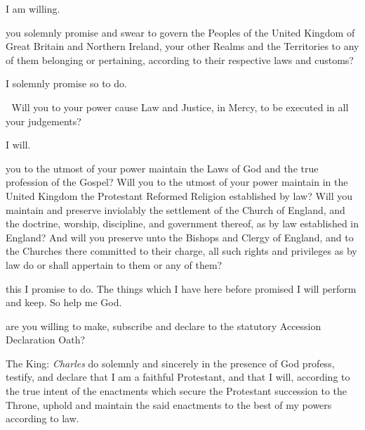 { I am willing.






 you solemnly promise and swear to govern the Peoples of the United
Kingdom of Great Britain and Northern Ireland, your other Realms and
the Territories to any of them belonging or pertaining, according to their
respective laws and customs?


I solemnly promise so to do.



 Will you to your power cause Law and Justice, in Mercy,
to be executed in all your judgements?


I will.


 you to the utmost of your power maintain the Laws of God and the
true profession of the Gospel? Will you to the utmost of your power
maintain in the United Kingdom the Protestant Reformed Religion
established by law? Will you maintain and preserve inviolably the
settlement of the Church of England, and the doctrine, worship, discipline,
and government thereof, as by law established in England? And will you
preserve unto the Bishops and Clergy of England, and to the Churches
there committed to their charge, all such rights and privileges as by law do
or shall appertain to them or any of them?



 this I promise to do.
The things which I have here before promised I will perform and keep.
So help me God.


\clearpage 
{}

 are you willing to make, subscribe and declare to the
statutory Accession Declaration Oath?



\vfill 
The King:
 \textit{Charles} do solemnly and sincerely in the presence of God profess, testify,
and declare that I am a faithful Protestant, and that I will, according to the
true intent of the enactments which secure the Protestant succession to
the Throne, uphold and maintain the said enactments to the best of my
powers according to law.
\vfill 


}
